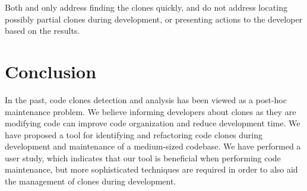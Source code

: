 \documentclass[nocopyrightspace,10pt]{sigplanconf}
\begin{document}
Both \cite{Keivanloo2011} and \cite{Lee2010} only address finding the
clones quickly, and do not address locating possibly partial clones
during development, or presenting actions to the developer based on
the results.

\section{Conclusion}
\label{sec:conclusion}

In the past, code clones detection and analysis has been viewed as a
post-hoc maintenance problem. 
We believe informing developers about clones as they are modifying code
 can improve code organization and reduce development time.
We have proposed a tool for identifying and refactoring code clones
during development and maintenance of a medium-sized codebase.
We have performed a user study, which indicates that our tool is 
beneficial when performing code maintenance, but more sophisticated 
techniques are required in order to also aid the management of clones
during development.


%

%
%
\end{document}
